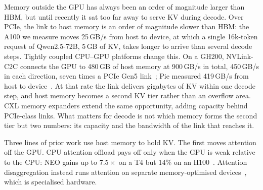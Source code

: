Memory outside the GPU has always been an order of magnitude larger than HBM,
but until recently it sat too far away to serve KV during decode. Over PCIe, the
link to host memory is an order of magnitude slower than HBM: the A100 we
measure moves 25\,GB/s from host to device, at which a single 16k-token
request of Qwen2.5-72B, 5\,GB of KV, takes longer to arrive than several decode
steps. Tightly coupled CPU--GPU platforms change this. On a GH200,
NVLink-C2C connects the GPU to 480\,GB of host memory at 900\,GB/s in total,
450\,GB/s in each direction, seven times a PCIe Gen5 link~\cite{gh200page};
Pie measured 419\,GB/s from host to device~\cite{pie}. At that rate the link
delivers gigabytes of KV within one decode step, and host memory becomes a
second KV tier rather than an overflow area. CXL memory expanders extend the
same opportunity, adding capacity behind PCIe-class links. What matters for
decode is not which memory forms the second tier but two numbers: its capacity
and the bandwidth of the link that reaches it.

Three lines of prior work use host memory to hold KV. The first moves
attention off the GPU. CPU attention
offload pays off only when the GPU is weak relative to the CPU: NEO gains up
to $7.5\times$ on a T4 but 14\% on an H100~\cite{neo}. Attention
disaggregation instead runs attention on separate memory-optimised
devices~\cite{lamina}, which is specialised hardware.

